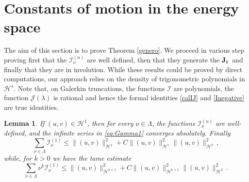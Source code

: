 \documentclass[reqno,11pt]{amsart}
\theoremstyle{plain}
\numberwithin{equation}{section}
\newtheorem{lemma}[theorem]{Lemma}
\renewcommand{\H}{\mathcal{H}}
\newcommand{\I}{{\texttt{\bf J}}}
\newcommand{\cI}{{\mathcal I}}
\begin{document}
{\section{Constants of motion in the energy space}
The aim of this section is to prove Theorem \ref{genero}. We proceed in various step proving first that the $\mathcal I^{(n)}_\nu$ are well defined, then that they generate the $\I_k$ and finally that they are in involution. While these results could be proved by direct computations, our approach relies on the density of trigonometric polynomials in $\H^s$. Note that, on Galerkin truncations, the functions $\cI$ are polynomials, the  function $\mathcal{J}(\lambda)$ is rational and hence the formal identities \eqref{calIJ} and \eqref{Inegative} are true identities.
\begin{lemma}\label{tameI}
If $(u, v) \in \H^1$, then for every $\nu \in \Lambda$, the functions  $\mathcal I_\nu^{(n)}$ are well-defined, and the infinite series in \eqref{eq:Gamma1} converges absolutely. Finally 
\begin{equation}
	\label{uno}
	\sum_{\nu\in \Lambda}  \mathcal I_\nu^{(1)} \leq 	\|(u,v)\|^2_{\H^{1}}+ C \|(u,v)\|^2_{\H^{1}} \|(u,v)\|^2_{\H^{2}}\,,
\end{equation}
while, for $k>0$ we have the tame estimate
\begin{equation}
	\label{due}
	\sum_{\nu\in \Lambda} \nu^k \mathcal I_\nu^{(1)} \leq 	\|(u,v)\|^2_{\H^{k+1}}+ C \|(u,v)\|^2_{\H^{k+1}} \|(u,v)\|^2_{\H^{2}}\,.
\end{equation}
	\end{lemma}
	
}
\end{document}
